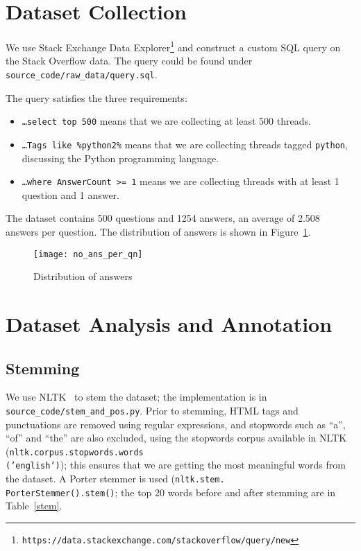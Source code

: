 \section{Dataset Collection}

We use Stack Exchange Data
Explorer\footnote{\texttt{https://data.stackexchange.com/stackoverflow/query/new}}
and construct a custom SQL query on the Stack Overflow data. The query could be
found under \texttt{source\_code/raw\_data/query.sql}.

The query satisfies the three requirements:

\begin{itemize}
    \item \texttt{\ldots select top 500} means that we are collecting at least
    500 threads.
    \item \texttt{\ldots Tags like \textquotesingle{}\%python2\%\textquotesingle{}}
    means that we are collecting threads tagged \texttt{python}, discussing the
    Python programming language.
    \item \texttt{\ldots where AnswerCount >= 1} means we are collecting
    threads with at least 1 question and 1 answer.
\end{itemize}

The dataset contains 500 questions and 1254 answers, an average of 2.508 answers
per question. The distribution of answers is shown in Figure~\ref{ans-dist}.

\begin{figure}[htp]
\texttt{[image: no\_ans\_per\_qn]}
\caption{Distribution of answers}\label{ans-dist}
\end{figure}

\section{Dataset Analysis and Annotation}

\subsection{Stemming}

We use NLTK~\cite{nltk} to stem the dataset; the implementation is in
\texttt{source\_code/stem\_and\_pos.py}.
Prior to stemming, HTML tags and punctuations are removed using regular
expressions, and stopwords such as ``a'', ``of'' and ``the'' are also
excluded, using the stopwords corpus available in NLTK
(\texttt{nltk.corpus.stopwords.words\\('english')}); this ensures that we are
getting the most meaningful words from the dataset. A Porter stemmer is 
used (\texttt{nltk.stem.\\PorterStemmer().stem()}; the top 20 words before
and after stemming are in Table~\ref{stem}.

